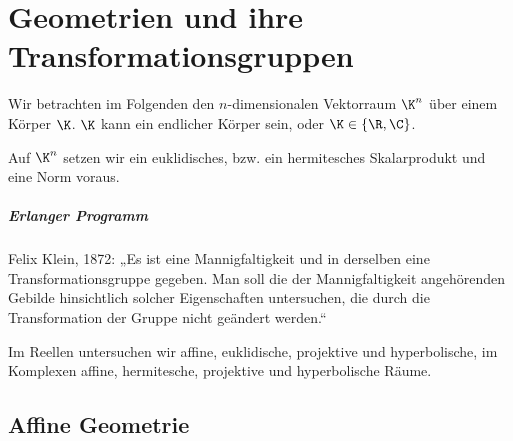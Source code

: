 \chapter{Geometrien und ihre Transformationsgruppen}


Wir betrachten im Folgenden den $n$-dimensionalen Vektorraum $\K^n$ über einem Körper $\K$.
$\K$ kann ein endlicher Körper sein, oder $\K \in \{\R, \C\}$.

Auf $\K^n$ setzen wir ein euklidisches, bzw. ein hermitesches Skalarprodukt und eine Norm voraus.

\paragraph{Erlanger Programm}

Felix Klein, 1872: „Es ist eine Mannigfaltigkeit und in derselben eine Transformationsgruppe gegeben.
Man soll die der Mannigfaltigkeit angehörenden Gebilde hinsichtlich solcher Eigenschaften untersuchen, die durch die Transformation der Gruppe nicht geändert werden.“

Im Reellen untersuchen wir affine, euklidische, projektive und hyperbolische, im Komplexen affine, hermitesche, projektive und hyperbolische Räume.


\section{Affine Geometrie}


